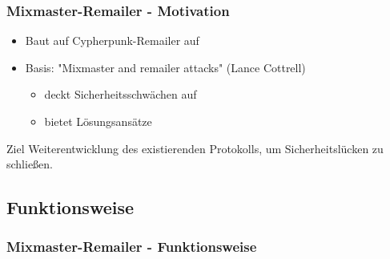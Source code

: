 \documentclass{beamer}
\begin{document}
\begin{frame}
	\frametitle{Mixmaster-Remailer - Motivation}
	\begin{itemize}
		\item Baut auf Cypherpunk-Remailer auf
		\item Basis: "Mixmaster and remailer attacks" (Lance Cottrell)
		\begin{itemize}	
			\item deckt Sicherheitsschwächen auf
			\item bietet Lösungsansätze
		\end{itemize}
	\end{itemize}

	\begin{exampleblock}{Ziel}
		\centering
		Weiterentwicklung des existierenden Protokolls, um Sicherheitslücken zu schließen.
	\end{exampleblock}
\end{frame}

\subsection{Funktionsweise}
\begin{frame}
	\frametitle{Mixmaster-Remailer - Funktionsweise}
	
\end{frame}
\end{document}
